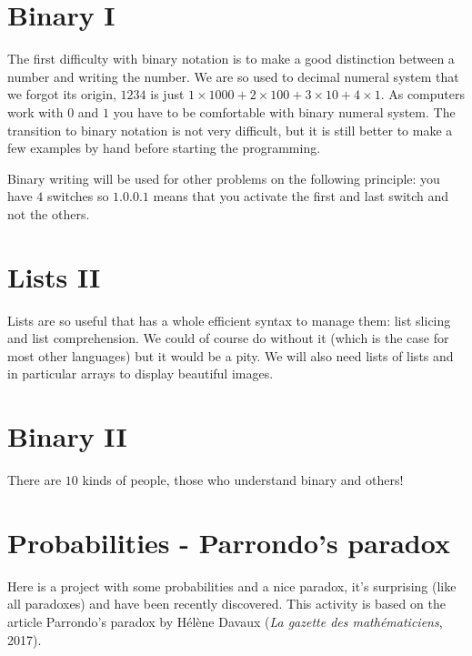 \documentclass[11pt,class=report,crop=false]{standalone}
\begin{document}
\section{Binary I}

The first difficulty with binary notation is to make a good distinction between a number and writing the number. We are so used to decimal numeral system that we forgot its origin, $1234$ is just $1\times 1000 + 2 \times 100 + 3 \times 10 + 4\times 1$.
As computers work with $0$ and $1$ you have to be comfortable with binary numeral system. The transition to binary notation is not very difficult, but it is still better to make a few examples by hand before starting the programming.

Binary writing will be used for other problems on the following principle: you have $4$ switches so $1.0.0.1$ means that you activate the first and last switch and not the others.


\section{Lists II}

Lists are so useful that \Python{} has a whole efficient syntax to manage them: list slicing and list comprehension. We could of course do without it (which is the case for most other languages) but it would be a pity.
We will also need lists of lists and in particular arrays to display beautiful images.


\section{Binary II}

There are $10$ kinds of people, those who understand binary and others!


\section{Probabilities - Parrondo's paradox}

Here is a project with some probabilities and a nice paradox, it's surprising (like all paradoxes) and have been recently discovered.
This activity is based on the article \og{}Parrondo's paradox\fg{} by Hélène Davaux (\emph{La gazette des mathématiciens}, 2017).
\end{document}
